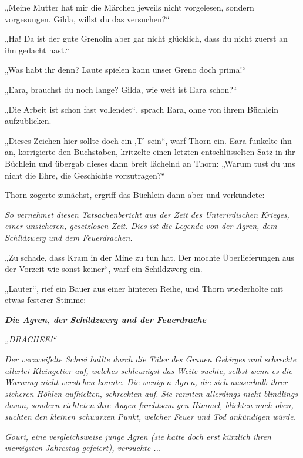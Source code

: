 \documentclass[10pt, a4paper, oneside]{book}
\begin{document}
„Meine Mutter hat mir die Märchen jeweils nicht vorgelesen, sondern vorgesungen. Gilda, willst du das versuchen?“

„Ha! Da ist der gute Grenolin aber gar nicht glücklich, dass du nicht zuerst an ihn gedacht hast.“

„Was habt ihr denn? Laute spielen kann unser Greno doch prima!“

„Eara, brauchst du noch lange? Gilda, wie weit ist Eara schon?“

„Die Arbeit ist schon fast vollendet“, sprach Eara, ohne von ihrem Büchlein aufzublicken.

„Dieses Zeichen hier sollte doch ein ‚T’ sein“, warf Thorn ein. Eara funkelte ihn an, korrigierte den Buchstaben, kritzelte einen letzten entschlüsselten Satz in ihr Büchlein und übergab dieses dann breit lächelnd an Thorn: „Warum tust du uns nicht die Ehre, die Geschichte vorzutragen?“

Thorn zögerte zunächst, ergriff das Büchlein dann aber und verkündete:\bigskip



\textit{So vernehmet diesen Tatsachenbericht aus der Zeit des Unterirdischen Krieges, einer unsicheren, gesetzlosen Zeit. Dies ist die Legende von der Agren, dem Schildzwerg und dem Feuerdrachen.}\bigskip



„Zu schade, dass Kram in der Mine zu tun hat. Der mochte Überlieferungen aus der Vorzeit wie sonst keiner“, warf ein Schildzwerg ein.

„Lauter“, rief ein Bauer aus einer hinteren Reihe, und Thorn wiederholte mit etwas festerer Stimme:\bigskip



\textbf{\textit{Die Agren, der Schildzwerg und der Feuerdrache}}\bigskip



\textit{„DRACHEE!“}

\textit{Der verzweifelte Schrei hallte durch die Täler des Grauen Gebirges und schreckte allerlei Kleingetier auf, welches schleunigst das Weite suchte, selbst wenn es die Warnung nicht verstehen konnte. Die wenigen Agren, die sich ausserhalb ihrer sicheren Höhlen aufhielten, schreckten auf. Sie rannten allerdings nicht blindlings davon, sondern richteten ihre Augen furchtsam gen Himmel, blickten nach oben, suchten den kleinen schwarzen Punkt, welcher Feuer und Tod ankündigen würde.}

\textit{Gouri, eine vergleichsweise junge Agren (sie hatte doch erst kürzlich ihren vierzigsten Jahrestag gefeiert), versuchte ...}
\end{document}
